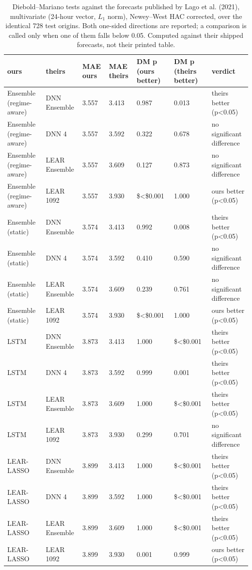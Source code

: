 \begin{table}[htbp]
\caption{Diebold--Mariano tests against the forecasts published by Lago et al. (2021), multivariate (24-hour vector, $L_1$ norm), Newey--West HAC corrected, over the identical 728 test origins. Both one-sided directions are reported; a comparison is called only when one of them falls below 0.05. Computed against their shipped forecasts, not their printed table.}
\label{tab:dm-vs-lago}
\begin{tabular}{lllllll}
\toprule
ours & theirs & MAE ours & MAE theirs & DM p (ours better) & DM p (theirs better) & verdict \\
\midrule
Ensemble (regime-aware) & DNN Ensemble & 3.557 & 3.413 & 0.987 & 0.013 & theirs better (p<0.05) \\
Ensemble (regime-aware) & DNN 4 & 3.557 & 3.592 & 0.322 & 0.678 & no significant difference \\
Ensemble (regime-aware) & LEAR Ensemble & 3.557 & 3.609 & 0.127 & 0.873 & no significant difference \\
Ensemble (regime-aware) & LEAR 1092 & 3.557 & 3.930 & \$<\$0.001 & 1.000 & ours better (p<0.05) \\
Ensemble (static) & DNN Ensemble & 3.574 & 3.413 & 0.992 & 0.008 & theirs better (p<0.05) \\
Ensemble (static) & DNN 4 & 3.574 & 3.592 & 0.410 & 0.590 & no significant difference \\
Ensemble (static) & LEAR Ensemble & 3.574 & 3.609 & 0.239 & 0.761 & no significant difference \\
Ensemble (static) & LEAR 1092 & 3.574 & 3.930 & \$<\$0.001 & 1.000 & ours better (p<0.05) \\
LSTM & DNN Ensemble & 3.873 & 3.413 & 1.000 & \$<\$0.001 & theirs better (p<0.05) \\
LSTM & DNN 4 & 3.873 & 3.592 & 0.999 & 0.001 & theirs better (p<0.05) \\
LSTM & LEAR Ensemble & 3.873 & 3.609 & 1.000 & \$<\$0.001 & theirs better (p<0.05) \\
LSTM & LEAR 1092 & 3.873 & 3.930 & 0.299 & 0.701 & no significant difference \\
LEAR-LASSO & DNN Ensemble & 3.899 & 3.413 & 1.000 & \$<\$0.001 & theirs better (p<0.05) \\
LEAR-LASSO & DNN 4 & 3.899 & 3.592 & 1.000 & \$<\$0.001 & theirs better (p<0.05) \\
LEAR-LASSO & LEAR Ensemble & 3.899 & 3.609 & 1.000 & \$<\$0.001 & theirs better (p<0.05) \\
LEAR-LASSO & LEAR 1092 & 3.899 & 3.930 & 0.001 & 0.999 & ours better (p<0.05) \\
\bottomrule
\end{tabular}
\end{table}
